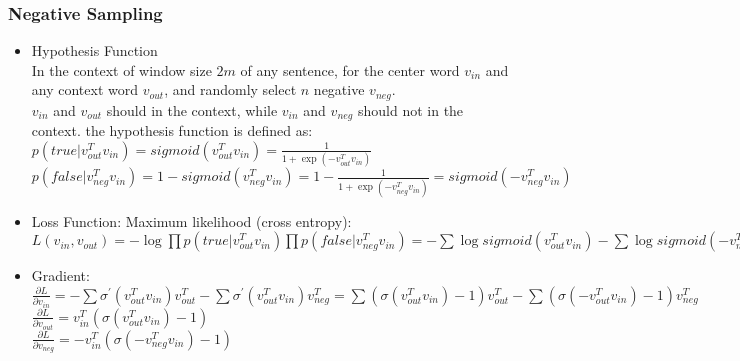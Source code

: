 \begin{frame}
\frametitle{Negative Sampling}
	\footnotesize
	\begin{itemize}
		\item Hypothesis Function \\
			In the context of window size $2m$ of any sentence, for the center word $v_{in}$ and any context word $v_{out}$, and randomly select $n$ negative $v_{neg}$.
			\\ $v_{in}$ and $v_{out}$ should in the context, while $v_{in}$ and $v_{neg}$ should not in the context.
			the hypothesis function is defined as:
			\\\hspace{0cm}$p(true|v_{out}^Tv_{in})=sigmoid(v_{out}^Tv_{in})=\frac{1}{1+\exp(-v_{out}^Tv_{in})}$
			\\\hspace{0cm}$p(false|v_{neg}^Tv_{in})=1-sigmoid(v_{neg}^Tv_{in})=1-\frac{1}{1+\exp(-v_{neg}^Tv_{in})}=sigmoid(-v_{neg}^Tv_{in})$
		\item Loss Function: 
			Maximum likelihood (cross entropy):
	\scriptsize
			\\$L(v_{in},v_{out})=-\log \prod p(true|v_{out}^Tv_{in})\prod p(false|v_{neg}^Tv_{in})
				=-\sum\log sigmoid(v_{out}^Tv_{in})-\sum \log sigmoid(-v_{neg}^Tv_{in}) 
				=-\sum\log \sigma(v_{out}^Tv_{in})-\sum \log \sigma(-v_{neg}^Tv_{in})$ 
	\footnotesize
		\item Gradient:
	\tiny
		\\ \hspace{0cm}$\frac{\partial{L}}{\partial{v_{in}}}
				= -\sum \sigma^ \prime(v_{out}^Tv_{in}) v_{out}^T - \sum \sigma^ \prime(v_{out}^Tv_{in}) v_{neg}^T 
				= \sum(\sigma(v_{out}^Tv_{in})-1) v_{out}^T - \sum(\sigma(-v_{out}^Tv_{in})-1) v_{neg}^T$
	\scriptsize
		\\ \hspace{0cm}$\frac{\partial{L}}{\partial{v_{out}}}
				=v_{in}^T(\sigma(v_{out}^Tv_{in})-1)$
		\\ \hspace{0cm}$\frac{\partial{L}}{\partial{v_{neg}}}
				=-v_{in}^T(\sigma(-v_{neg}^Tv_{in})-1)$
	\end{itemize}
\end{frame}
